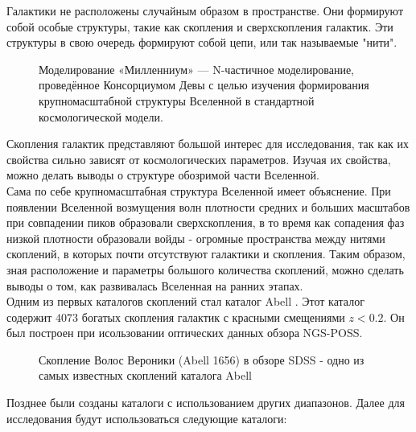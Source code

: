 \Introduction

Галактики не расположены случайным образом в пространстве. Они формируют собой особые структуры, 
такие как скопления и сверхскопления галактик. Эти структуры в свою очередь формируют собой цепи, 
или так называемые "нити".\\

\begin{figure}
    \caption{Моделирование «Милленниум» — N-частичное моделирование, проведённое Консорциумом 
        Девы с целью изучения формирования крупномасштабной структуры Вселенной в стандартной
        космологической модели.}
\end{figure}

Скопления галактик представляют большой интерес для исследования, так как их свойства сильно зависят 
от космологических параметров. Изучая их свойства, можно делать выводы о структуре обозримой части 
Вселенной.\\

Сама по себе крупномасштабная структура Вселенной имеет объяснение. При появлении Вселенной 
возмущения волн плотности средних и больших масштабов при совпадении пиков образовали сверхскопления,
в то время как сопадения фаз низкой плотности образовали войды - огромные пространства между нитями 
скоплений, в которых почти отсутствуют галактики и скопления. Таким образом, зная расположение и 
параметры большого количества скоплений, можно сделать выводы о том, как развивалась Вселенная на 
ранних этапах.\\

Одним из первых каталогов скоплений стал каталог Abell \cite{Abell}. Этот каталог содержит $4073$ 
богатых скопления галактик с красными смещениями $z < 0.2$. Он был построен при исользовании 
оптических данных обзора NGS-POSS.\\

\begin{figure}
    \caption{Скопление Волос Вероники (Abell 1656) в обзоре SDSS - одно из самых известных 
        скоплений каталога Abell}
\end{figure}

Позднее были созданы каталоги с использованием других диапазонов. Далее для исследования будут 
использоваться следующие каталоги:\\

